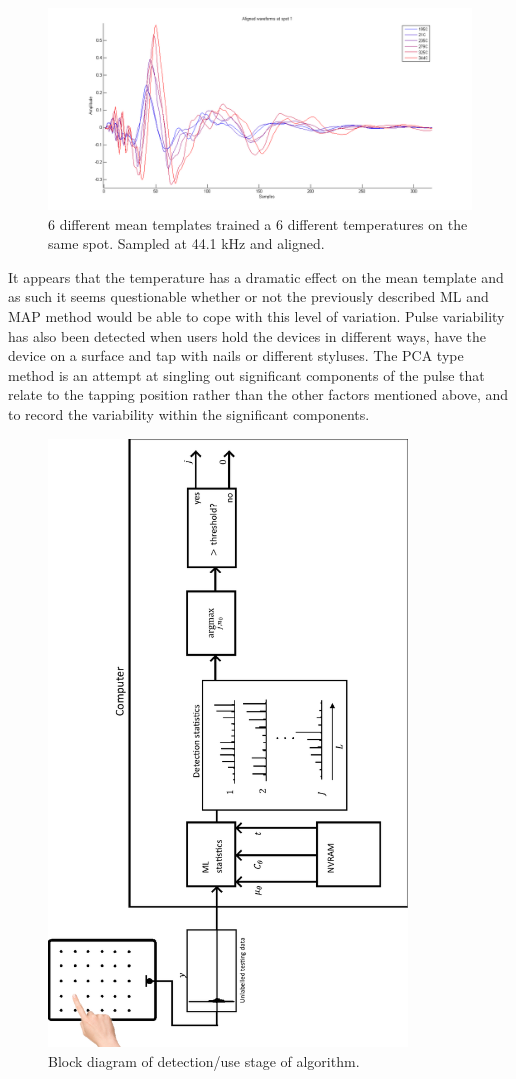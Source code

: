 \begin{figure}[!]
\centering
\includegraphics[width=150mm]{shiftOverTemperature.png}
\caption{6 different mean templates trained a 6 different temperatures on the same spot. Sampled at 44.1 kHz and aligned.}\label{fig:shiftOverTemperature}
\end{figure}
It appears that the temperature has a dramatic effect on the mean template and as such it seems questionable whether or not the previously described ML and MAP method would be able to cope with this level of variation. Pulse variability has also been detected when users hold the devices in different ways, have the device on a surface and tap with nails or different styluses. The PCA type method is an attempt at singling out significant components of the pulse that relate to the tapping position rather than the other factors mentioned above, and to record the variability within the significant components.

\begin{figure}[!]
\centering
\includegraphics[width=360px]{testingSystemPlot.pdf}
\caption{Block diagram of detection/use stage of algorithm.}\label{fig:testingSystemPlot}
\end{figure}

